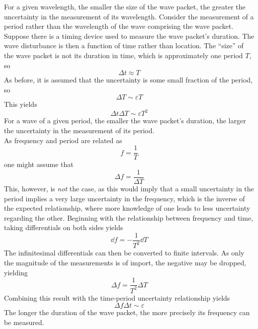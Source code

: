 \documentclass{subfiles}
\begin{document}
			For a given wavelength, the smaller the size of the wave packet, the greater the uncertainty in the measurement of its wavelength.
			Consider the measurement of a period rather than the wavelength of the wave comprising the wave packet. Suppose there is a timing device used to measure the wave packet's duration. The wave disturbance is then a function of time rather than location. The \enquote{size} of the wave packet is not its duration in time, which is approximately one period \(T\), so
				\[\Delta t \approx T\]
				As before, it is assumed that the uncertainty is some small fraction of the period, so
				\[\Delta T \sim \varepsilon T\]
				This yields
				\[\Delta t \Delta T \sim \varepsilon T^2 \tag{classical time-period uncertainty relationship}\]
				For a wave of a given period, the smaller the wave packet's duration, the larger the uncertainty in the measurement of its period. \\
			As frequency and period are related as
				\[f = \frac{1}{T}\]
				one might assume that
				\[\Delta f = \frac{1}{\Delta T} \tag{incorrect time-frequency relationship}\]
				This, however, is \textit{not} the case, as this would imply that a small uncertainty in the period implies a very large uncertainty in the frequency, which is the inverse of the expected relationship, where more knowledge of one leads to less uncertainty regarding the other. Beginning with the relationship between frequency and time, taking differentials on both sides yields
				\[\dd{f} = -\frac{1}{T^2}\dd{T}\]
				The infinitesimal differentials can then be converted to finite intervals. As only the magnitude of the measurements is of import, the negative may be dropped, yielding
				\[\Delta f = \frac{1}{T^2}\Delta T\]
				Combining this result with the time-period uncertainty relationship yields
				\[\Delta f \Delta t \sim \varepsilon \tag{classical time-frequency uncertainty relationship}\]
				The longer the duration of the wave packet, the more precisely its frequency can be measured.
\end{document}
